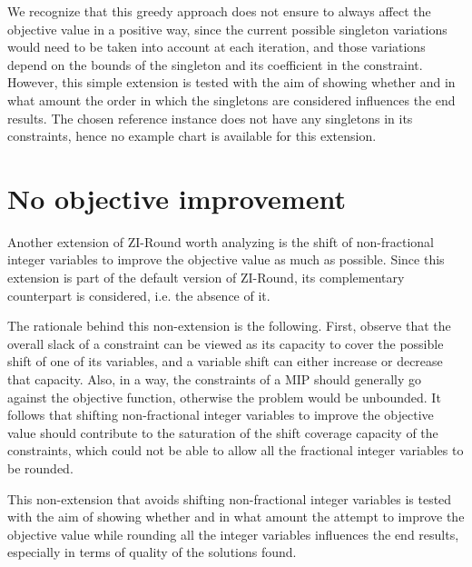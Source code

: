 \documentclass[a4paper,12pt,twoside]{scrbook}
\begin{document}
We recognize that this greedy approach does not ensure to always affect the objective value in a positive way, since the current possible singleton variations would need to be taken into account at each iteration, and those variations depend on the bounds of the singleton and its coefficient in the constraint. However, this simple extension is tested with the aim of showing whether and in what amount the order in which the singletons are considered influences the end results. The chosen reference instance does not have any singletons in its constraints, hence no example chart is available for this extension.

\section{No objective improvement}
Another extension of ZI-Round worth analyzing is the shift of non-fractional integer variables to improve the objective value as much as possible. Since this extension is part of the default version of ZI-Round, its complementary counterpart is considered, i.e. the absence of it. \par

The rationale behind this non-extension is the following. First, observe that the overall slack of a constraint can be viewed as its capacity to cover the possible shift of one of its variables, and a variable shift can either increase or decrease that capacity. Also, in a way, the constraints of a MIP should generally go against the objective function, otherwise the problem would be unbounded. It follows that shifting non-fractional integer variables to improve the objective value should contribute to the saturation of the shift coverage capacity of the constraints, which could not be able to allow all the fractional integer variables to be rounded. \par

This non-extension that avoids shifting non-fractional integer variables is tested with the aim of showing whether and in what amount the attempt to improve the objective value while rounding all the integer variables influences the end results, especially in terms of quality of the solutions found. \par
\end{document}
